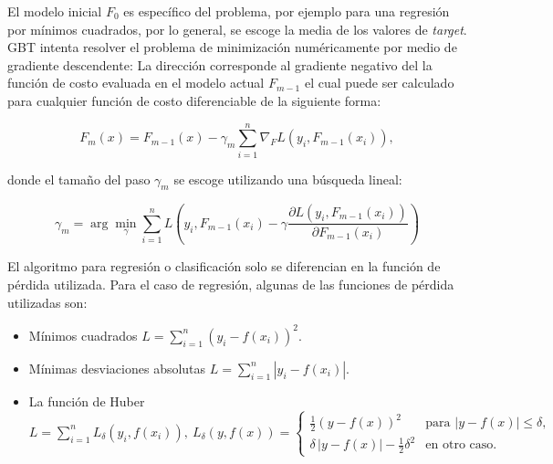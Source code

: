 \documentclass[spanish]{article}
\begin{document}
                El modelo inicial $F_{0}$ es específico del problema, por ejemplo para una regresión por mínimos cuadrados, por lo general, se escoge la media
                de los valores de \emph{target}. \\
                
                GBT intenta resolver el problema de minimización numéricamente por medio de gradiente descendente: La dirección corresponde al gradiente
                negativo del la función de costo evaluada en el modelo actual $F_{m-1}$ el cual puede ser calculado para cualquier función de costo diferenciable
                de la siguiente forma:

                \begin{equation}
                    F_m(x) = F_{m-1}(x) - \gamma_m \sum_{i=1}^{n} \nabla_F L(y_i, F_{m-1}(x_i)),
                \end{equation}
                
                donde el tamaño del paso $\gamma_m$ se escoge utilizando una búsqueda lineal:
                
                \begin{equation}
                    \gamma_m = \arg\min_{\gamma} \sum_{i=1}^{n} L\left(y_i, F_{m-1}(x_i) - \gamma \frac{\partial L(y_i, F_{m-1}(x_i))}{\partial F_{m-1}(x_i)}\right)
                \end{equation}
                 
                El algoritmo para regresión o clasificación solo se diferencian en la función de pérdida utilizada. Para el caso de regresión, algunas de las funciones
                de pérdida utilizadas son:
                \begin{itemize}
                    \item Mínimos cuadrados $L = \sum_{i=1}^n (y_i - f(x_i))^2$.
                    \item Mínimas desviaciones absolutas $L = \sum_{i=1}^n |y_i - f(x_i)|$.
                    \item La función de Huber $L = \sum_{i=1}^n L_{\delta}(y_i, f(x_i)), ~ L_{\delta }(y,f(x))=\begin{cases}{\frac  {1}{2}}(y-f(x))^{2} 
                        & {\textrm{para }}|y-f(x)|\leq \delta ,\\ \delta \,|y-f(x)|-{\frac  {1}{2}}\delta ^{2} & {\textrm{en otro caso.}}\end{cases}$
                \end{itemize}
\end{document}
